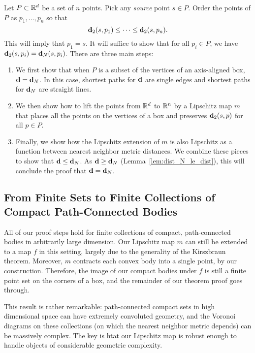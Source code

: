 \label{sec:the_proof}

  Let $P\subset \mathbb{R}^d$ be a set of $n$ points.
  Pick any \emph{source} point $s\in P$.
  Order the points of $P$ as $p_1,\ldots ,p_n$ so that
  \[
    \mathbf{d}_2(s,p_1) \le \cdots \le \mathbf{d}_2(s, p_n).
  \]
  This will imply that $p_1 = s$.
  It will suffice to show that for all $p_i\in P$, we have $\mathbf{d}_2(s,p_i) = \mathbf{d}_N(s,p_i)$.
  There are three main steps:
  \begin{enumerate}
    \item We first show that when $P$ is a subset of the vertices of an axis-aligned box, $\mathbf{d} = \mathbf{d}_N$.  In this case, shortest paths for $\mathbf{d}$ are single edges and shortest paths for $\mathbf{d}_N$ are straight lines.
    \item We then show how to lift the points from $\mathbb{R}^d$ to $\mathbb{R}^n$ by a Lipschitz map $m$ that places all the points on the vertices of a box and preserves $\mathbf{d}_2(s,p)$ for all $p\in P$.
    \item Finally, we show how the Lipschitz extension of $m$ is also Lipschitz as a function between nearest neighbor metric distances.  We combine these pieces to show that $\mathbf{d} \le \mathbf{d}_N$.  As $\mathbf{d} \ge \mathbf{d}_N$ (Lemma~\ref{lem:dist_N_le_dist}), this will conclude the proof that $\mathbf{d} = \mathbf{d}_N$.
  \end{enumerate}
  
  
  
\subsection{From Finite Sets to Finite Collections of Compact Path-Connected Bodies}
All of our proof steps hold for finite collections of compact,
path-connected bodies in arbitrarily large dimension. Our Lipschitz map $m$ can
still be extended to a map $f$ in this setting, largely due to the
generality of the Kirszbraun theorem. Moreover, $m$ contracts each convex
body into a single point, by our construction. Therefore, the image of our
compact bodies under $f$ is still a finite point set on the corners of a
box, and the remainder of our theorem proof goes through.

This result is rather remarkable: path-connected compact sets in high
dimensional space can have extremely convoluted geometry, and the Voronoi diagrams
on these collections (on which the nearest neighbor metric depends) can be
massively complex.  The key is htat our Lipschitz map is robust enough to
handle objects of considerable geometric complexity.
  
  
